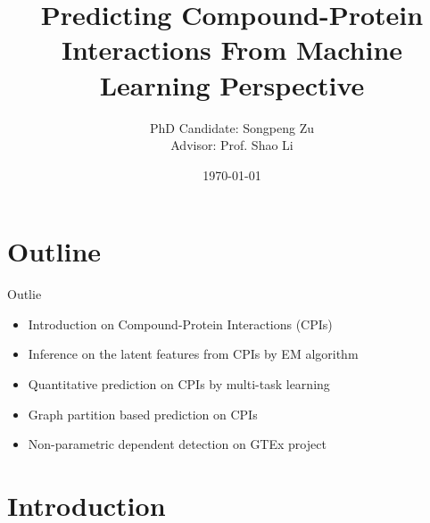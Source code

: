 \documentclass[mathserif,fleqn]{beamer}
\begin{document}
\title{Predicting Compound-Protein Interactions From Machine Learning Perspective}
\author[zusp]{PhD Candidate: Songpeng Zu\\Advisor: Prof. Shao Li}
\date[\initclock\tdtime]{\today}
\frame[plain]{\titlepage}
\section*{Outline}
\frame
{
\begin{beamerboxesrounded}[upper=uppercol,shadow=true]{Outlie}
\begin{spacing}{1.2}
\begin{itemize}
  \item Introduction on Compound-Protein Interactions (CPIs)
  \item Inference on the latent features from CPIs by EM algorithm
  \item Quantitative prediction on CPIs by multi-task learning
  \item Graph partition based prediction on CPIs
  \item Non-parametric dependent detection on GTEx project
\end{itemize}
\end{spacing}
\end{beamerboxesrounded}
}
\section{Introduction}
\frame{

}
\end{document}
